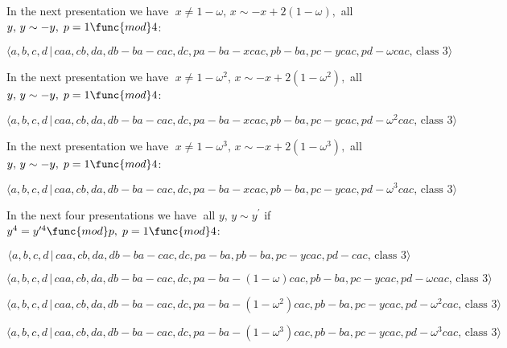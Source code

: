 \documentclass[10pt]{article}
\begin{document}
In the next presentation we have $\;x\neq 1-\omega ,\,x\sim -x+2(1-\omega ),$
all $y,\,y\sim -y,\;p=1\func{mod}4$:

\begin{equation}
\langle
a,b,c,d\,|\,caa,cb,da,db-ba-cac,dc,pa-ba-xcac,pb-ba,pc-ycac,pd-\omega cac,\,%
\text{class }3\rangle  \tag{7.4236}
\end{equation}

In the next presentation we have $\;x\neq 1-\omega ^{2},\,x\sim
-x+2(1-\omega ^{2}),$ all $y,\,y\sim -y,\;p=1\func{mod}4$:

\begin{equation}
\langle
a,b,c,d\,|\,caa,cb,da,db-ba-cac,dc,pa-ba-xcac,pb-ba,pc-ycac,pd-\omega
^{2}cac,\,\text{class }3\rangle  \tag{7.4237}
\end{equation}

In the next presentation we have $\;x\neq 1-\omega ^{3},\,x\sim
-x+2(1-\omega ^{3}),$ all $y,\,y\sim -y,\;p=1\func{mod}4$:

\begin{equation}
\langle
a,b,c,d\,|\,caa,cb,da,db-ba-cac,dc,pa-ba-xcac,pb-ba,pc-ycac,pd-\omega
^{3}cac,\,\text{class }3\rangle  \tag{7.4238}
\end{equation}

In the next four presentations we have $\;$all $y,\,y\sim y^{\prime }$ if $%
y^{4}=y^{\prime 4}\func{mod}p,\;p=1\func{mod}4$:

\begin{equation}
\langle a,b,c,d\,|\,caa,cb,da,db-ba-cac,dc,pa-ba,pb-ba,pc-ycac,pd-cac,\,%
\text{class }3\rangle  \tag{7.4239}
\end{equation}

\begin{equation}
\langle a,b,c,d\,|\,caa,cb,da,db-ba-cac,dc,pa-ba-(1-\omega
)cac,pb-ba,pc-ycac,pd-\omega cac,\,\text{class }3\rangle  \tag{7.4240}
\end{equation}

\begin{equation}
\langle a,b,c,d\,|\,caa,cb,da,db-ba-cac,dc,pa-ba-(1-\omega
^{2})cac,pb-ba,pc-ycac,pd-\omega ^{2}cac,\,\text{class }3\rangle 
\tag{7.4241}
\end{equation}

\begin{equation}
\langle a,b,c,d\,|\,caa,cb,da,db-ba-cac,dc,pa-ba-(1-\omega
^{3})cac,pb-ba,pc-ycac,pd-\omega ^{3}cac,\,\text{class }3\rangle 
\tag{7.4242}
\end{equation}
\end{document}
